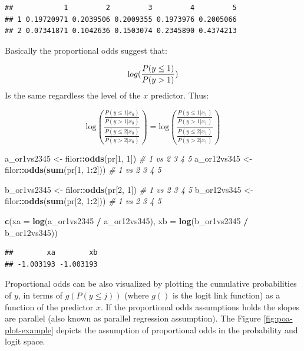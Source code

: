 \documentclass[
  man,floatsintext]{apa6}
\newenvironment{Shaded}{\begin{snugshade}}{\end{snugshade}}
\newcommand{\AttributeTok}[1]{\textcolor[rgb]{0.13,0.29,0.53}{#1}}
\newcommand{\CommentTok}[1]{\textcolor[rgb]{0.56,0.35,0.01}{\textit{#1}}}
\newcommand{\DecValTok}[1]{\textcolor[rgb]{0.00,0.00,0.81}{#1}}
\newcommand{\FunctionTok}[1]{\textcolor[rgb]{0.13,0.29,0.53}{\textbf{#1}}}
\newcommand{\NormalTok}[1]{#1}
\newcommand{\OtherTok}[1]{\textcolor[rgb]{0.56,0.35,0.01}{#1}}
\newcommand{\SpecialCharTok}[1]{\textcolor[rgb]{0.81,0.36,0.00}{\textbf{#1}}}
\begin{document}
\begin{verbatim}
##            1         2         3         4         5
## 1 0.19720971 0.2039506 0.2009355 0.1973976 0.2005066
## 2 0.07341871 0.1042636 0.1503074 0.2345890 0.4374213
\end{verbatim}

Basically the proportional odds suggest that:

\[
\text log(\frac{P(y \leq 1)}{P(y > 1)})
\]
Is the same regardless the level of the \(x\) predictor. Thus:

\[
\text{log}\left(\frac{\frac{P(y \leq 1|x_0)}{P(y > 1|x_0)}}{\frac{P(y \leq 2|x_0)}{P(y > 2|x_0)}}\right) = \text{log}\left(\frac{\frac{P(y \leq 1|x_1)}{P(y > 1|x_1)}}{\frac{P(y \leq 2|x_1)}{P(y > 2|x_1)}}\right)
\]

\begin{Shaded}
\begin{Highlighting}[]
\NormalTok{a\_or1vs2345 }\OtherTok{\textless{}{-}}\NormalTok{ filor}\SpecialCharTok{::}\FunctionTok{odds}\NormalTok{(pr[}\DecValTok{1}\NormalTok{, }\DecValTok{1}\NormalTok{]) }\CommentTok{\# 1 vs 2 3 4 5}
\NormalTok{a\_or12vs345 }\OtherTok{\textless{}{-}}\NormalTok{ filor}\SpecialCharTok{::}\FunctionTok{odds}\NormalTok{(}\FunctionTok{sum}\NormalTok{(pr[}\DecValTok{1}\NormalTok{, }\DecValTok{1}\SpecialCharTok{:}\DecValTok{2}\NormalTok{])) }\CommentTok{\# 1 vs 2 3 4 5}

\NormalTok{b\_or1vs2345 }\OtherTok{\textless{}{-}}\NormalTok{ filor}\SpecialCharTok{::}\FunctionTok{odds}\NormalTok{(pr[}\DecValTok{2}\NormalTok{, }\DecValTok{1}\NormalTok{]) }\CommentTok{\# 1 vs 2 3 4 5}
\NormalTok{b\_or12vs345 }\OtherTok{\textless{}{-}}\NormalTok{ filor}\SpecialCharTok{::}\FunctionTok{odds}\NormalTok{(}\FunctionTok{sum}\NormalTok{(pr[}\DecValTok{2}\NormalTok{, }\DecValTok{1}\SpecialCharTok{:}\DecValTok{2}\NormalTok{])) }\CommentTok{\# 1 vs 2 3 4 5}

\FunctionTok{c}\NormalTok{(}\AttributeTok{xa =} \FunctionTok{log}\NormalTok{(a\_or1vs2345 }\SpecialCharTok{/}\NormalTok{ a\_or12vs345), }\AttributeTok{xb =} \FunctionTok{log}\NormalTok{(b\_or1vs2345 }\SpecialCharTok{/}\NormalTok{ b\_or12vs345))}
\end{Highlighting}
\end{Shaded}

\begin{verbatim}
##        xa        xb 
## -1.003193 -1.003193
\end{verbatim}

Proportional odds can be also visualized by plotting the cumulative probabilities of \(y\), in terms of \(g(P(y \leq j))\) (where \(g()\) is the logit link function) as a function of the predictor \(x\). If the proportional odds assumptions holds the slopes are parallel (also known as parallel regression assumption). The Figure \ref{fig:poa-plot-example} depicts the assumption of proportional odds in the probability and logit space.
\end{document}
